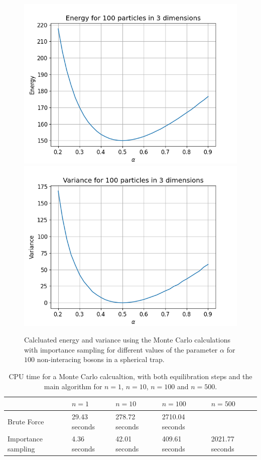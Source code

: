 \documentclass[a4paper, 10pt, english]{revtex4-2} %
\begin{document}
    \begin{figure}[!ht]
        \centering
        \includegraphics[width=\imwidth]{figures/Energy_C_100.png}
        \includegraphics[width=\imwidth]{figures/Varience_C_100.png}
        \caption{Calcluated energy and variance using the Monte Carlo calculations with importance sampling for different values of the parameter $\alpha$ for $100$ non-interacing bosons in a spherical trap.}
        \label{fig: C100}
    \end{figure}\newpage
    
    \begin{table}[!ht]
        \begin{tabular}{|l|l|l|l|l|}
        \hline
                            & $n=1$         & $n=10$         & $n=100$         & $n=500$         \\ \hline
        Brute Force         & 29.43 seconds & 278.72 seconds & 2710.04 seconds &            \\ \hline
        Importance sampling & 4.36 seconds  & 42.01 seconds  & 409.61 seconds  & 2021.77 seconds \\ \hline
        \end{tabular}
        \caption{CPU time for a Monte Carlo calcualtion, with both equilibration steps and the main algorithm for $n=1$, $n=10$, $n=100$ and $n = 500$.}
        \label{table: time spent}
    \end{table}
\end{document}

